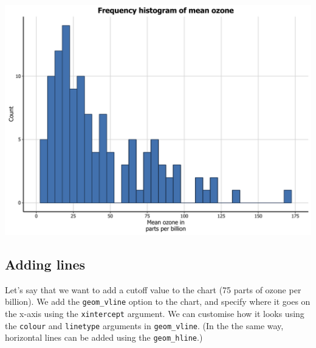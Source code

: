 \documentclass[]{article}
\begin{document}
\begin{center}\includegraphics{0_all_posts_pdf/histogram_16-1} \end{center}

\subsection{Adding lines}\label{adding-lines}

Let's say that we want to add a cutoff value to the chart (75 parts of
ozone per billion). We add the \texttt{geom\_vline} option to the chart,
and specify where it goes on the x-axis using the \texttt{xintercept}
argument. We can customise how it looks using the \texttt{colour} and
\texttt{linetype} arguments in \texttt{geom\_vline}. (In the the same
way, horizontal lines can be added using the \texttt{geom\_hline}.)
\end{document}
